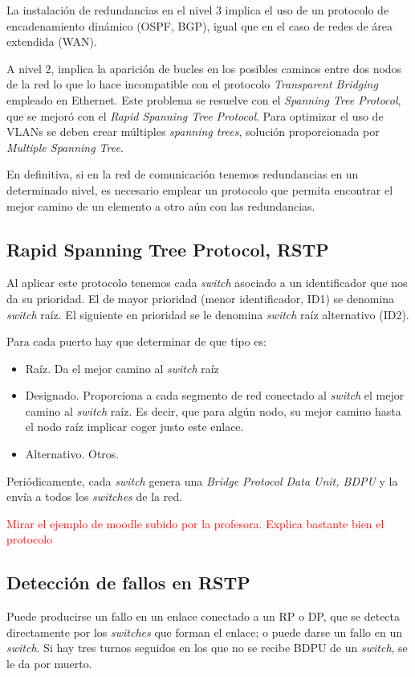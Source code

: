 La instalación de redundancias en el nivel 3 implica el uso de un protocolo de encadenamiento dinámico (OSPF, BGP), igual que en el caso de redes de área extendida (WAN).

A nivel 2, implica la aparición de bucles en los posibles caminos entre dos nodos de la red lo que lo hace incompatible con el protocolo \textit{Transparent Bridging} empleado en Ethernet. Este problema se resuelve con el \textit{Spanning Tree Protocol}, que se mejoró con el \textit{Rapid Spanning Tree Protocol}. Para optimizar el uso de VLANs se deben crear múltiples \textit{spanning trees}, solución proporcionada por \textit{Multiple Spanning Tree}.

En definitiva, si en la red de comunicación tenemos redundancias en un determinado nivel, es necesario emplear un protocolo que permita encontrar el mejor camino de un elemento a otro aún con las redundancias.

\subsection{Rapid Spanning Tree Protocol, RSTP}

Al aplicar este protocolo tenemos cada \textit{switch} asociado a un identificador que nos da su prioridad. El de mayor prioridad (menor identificador, ID1) se denomina \textit{switch} raíz. El siguiente en prioridad se le denomina \textit{switch} raíz alternativo (ID2).

Para cada puerto hay que determinar de que tipo es:
\begin{itemize}
\item Raíz. Da el mejor camino al \textit{switch} raíz

\item Designado. Proporciona a cada segmento de red conectado al \textit{switch} el mejor camino al \textit{switch} raíz. Es decir, que para algún nodo, su mejor camino hasta el nodo raíz implicar coger justo este enlace.

\item Alternativo. Otros.
\end{itemize}

Periódicamente, cada \textit{switch} genera una \textit{Bridge Protocol Data Unit, BDPU} y la envía a todos los \textit{switches} de la red.

\textcolor{red}{Mirar el ejemplo de moodle subido por la profesora. Explica bastante bien el protocolo}

\subsection{Detección de fallos en RSTP}
Puede producirse un fallo en un enlace conectado a un RP o DP, que se detecta directamente por los \textit{switches} que forman el enlace; o puede darse un fallo en un \textit{switch}. Si hay tres turnos seguidos en los que no se recibe BDPU de un \textit{switch}, se le da por muerto.

